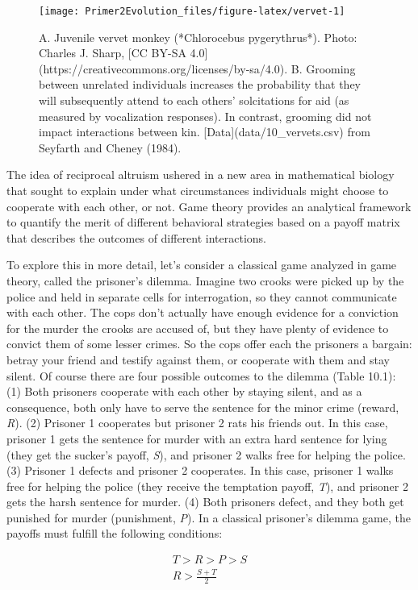 \documentclass[
]{book}
\begin{document}
\begin{figure}
\texttt{[image: Primer2Evolution\_files/figure-latex/vervet-1]} \caption{A. Juvenile vervet monkey (*Chlorocebus pygerythrus*). Photo: Charles J. Sharp, [CC BY-SA 4.0](https://creativecommons.org/licenses/by-sa/4.0). B. Grooming between unrelated individuals increases the probability that they will subsequently attend to each others' solcitations for aid (as measured by vocalization responses). In contrast, grooming did not impact interactions between kin. [Data](data/10_vervets.csv) from Seyfarth and Cheney (1984).}\label{fig:vervet}
\end{figure}

The idea of reciprocal altruism ushered in a new area in mathematical biology that sought to explain under what circumstances individuals might choose to cooperate with each other, or not. Game theory provides an analytical framework to quantify the merit of different behavioral strategies based on a payoff matrix that describes the outcomes of different interactions.

To explore this in more detail, let's consider a classical game analyzed in game theory, called the prisoner's dilemma. Imagine two crooks were picked up by the police and held in separate cells for interrogation, so they cannot communicate with each other. The cops don't actually have enough evidence for a conviction for the murder the crooks are accused of, but they have plenty of evidence to convict them of some lesser crimes. So the cops offer each the prisoners a bargain: betray your friend and testify against them, or cooperate with them and stay silent. Of course there are four possible outcomes to the dilemma (Table 10.1): (1) Both prisoners cooperate with each other by staying silent, and as a consequence, both only have to serve the sentence for the minor crime (reward, \emph{R}). (2) Prisoner 1 cooperates but prisoner 2 rats his friends out. In this case, prisoner 1 gets the sentence for murder with an extra hard sentence for lying (they get the sucker's payoff, \emph{S}), and prisoner 2 walks free for helping the police. (3) Prisoner 1 defects and prisoner 2 cooperates. In this case, prisoner 1 walks free for helping the police (they receive the temptation payoff, \emph{T}), and prisoner 2 gets the harsh sentence for murder. (4) Both prisoners defect, and they both get punished for murder (punishment, \emph{P}). In a classical prisoner's dilemma game, the payoffs must fulfill the following conditions:

\begin{align} 
T>R>P>S \label{eq:45} \\
R>\frac{S+T}{2} \label{eq:46}
\end{align}
\end{document}

